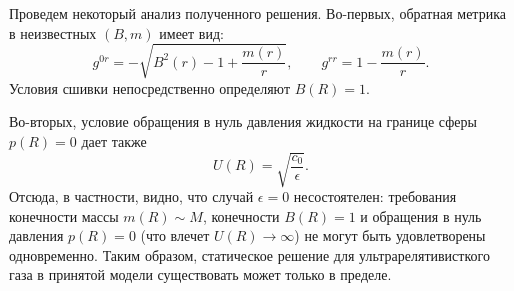 \documentclass[\docroot/reports/draft/report.tex]{subfiles}
\begin{document}
    Проведем некоторый анализ полученного решения. Во-первых, обратная метрика в неизвестных $(B,m)$ имеет вид:
    \begin{equation*}
        g^{0r} = - \sqrt{B^2(r) - 1 + \frac{m(r)}{r}} , \qquad
        g^{rr} = 1 - \frac{m(r)}{r} .
    \end{equation*}
    Условия сшивки непосредственно определяют $B(R) = 1$.

    Во-вторых, условие обращения в нуль давления жидкости на границе сферы $p(R) = 0$ дает также
    \begin{equation*}
        U(R) = \sqrt{\frac{c_0}{\epsilon}} .
    \end{equation*}
    Отсюда, в частности, видно, что случай $\epsilon = 0$ несостоятелен: требования конечности массы $m(R) \sim M$, конечности $B(R) = 1$ и обращения в нуль давления $p(R) = 0$ (что влечет $U(R) \to \infty$) не могут быть удовлетворены одновременно. Таким образом, статическое решение для ультрарелятивисткого газа в принятой модели существовать может только в пределе.

\end{document}
